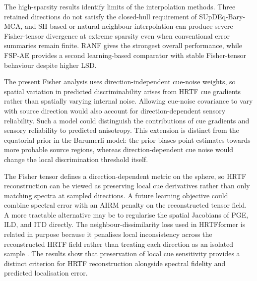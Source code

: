 \documentclass[journal]{IEEEtran}
\begin{document}
The high-sparsity results identify limits of the interpolation methods. Three retained directions do not satisfy the closed-hull requirement of SUpDEq-Bary-MCA, and SH-based or natural-neighbour interpolation can produce severe Fisher-tensor divergence at extreme sparsity even when conventional error summaries remain finite. RANF gives the strongest overall performance, while FSP-AE provides a second learning-based comparator with stable Fisher-tensor behaviour despite higher LSD.

The present Fisher analysis uses direction-independent cue-noise weights, so spatial variation in predicted discriminability arises from HRTF cue gradients rather than spatially varying internal noise. Allowing cue-noise covariance to vary with source direction would also account for direction-dependent sensory reliability. Such a model could distinguish the contributions of cue gradients and sensory reliability to predicted anisotropy. This extension is distinct from the equatorial prior in the Barumerli model: the prior biases point estimates towards more probable source regions, whereas direction-dependent cue noise would change the local discrimination threshold itself.

The Fisher tensor defines a direction-dependent metric on the sphere, so HRTF reconstruction can be viewed as preserving local cue derivatives rather than only matching spectra at sampled directions. A future learning objective could combine spectral error with an AIRM penalty on the reconstructed tensor field. A more tractable alternative may be to regularise the spatial Jacobians of PGE, ILD, and ITD directly. The neighbour-dissimilarity loss used in HRTFformer is related in purpose because it penalises local inconsistency across the reconstructed HRTF field rather than treating each direction as an isolated sample \cite{Hu2026HRTFformer}. The results show that preservation of local cue sensitivity provides a distinct criterion for HRTF reconstruction alongside spectral fidelity and predicted localisation error.
\end{document}
